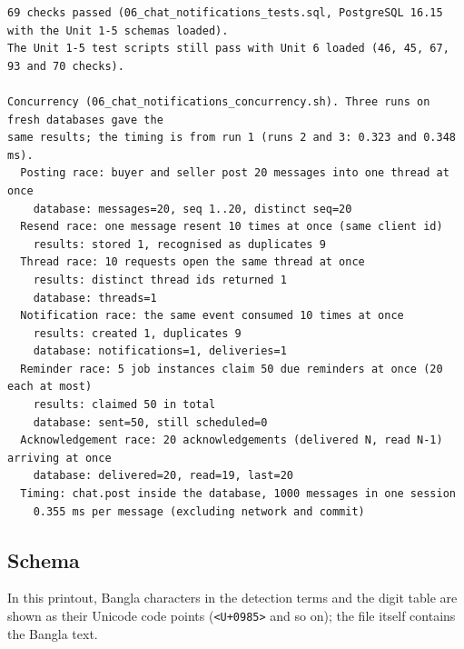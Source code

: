 \documentclass[11pt,a4paper]{article}
\begin{document}
{\begin{verbatim}
69 checks passed (06_chat_notifications_tests.sql, PostgreSQL 16.15 with the Unit 1-5 schemas loaded).
The Unit 1-5 test scripts still pass with Unit 6 loaded (46, 45, 67, 93 and 70 checks).

Concurrency (06_chat_notifications_concurrency.sh). Three runs on fresh databases gave the
same results; the timing is from run 1 (runs 2 and 3: 0.323 and 0.348 ms).
  Posting race: buyer and seller post 20 messages into one thread at once
    database: messages=20, seq 1..20, distinct seq=20
  Resend race: one message resent 10 times at once (same client id)
    results: stored 1, recognised as duplicates 9
  Thread race: 10 requests open the same thread at once
    results: distinct thread ids returned 1
    database: threads=1
  Notification race: the same event consumed 10 times at once
    results: created 1, duplicates 9
    database: notifications=1, deliveries=1
  Reminder race: 5 job instances claim 50 due reminders at once (20 each at most)
    results: claimed 50 in total
    database: sent=50, still scheduled=0
  Acknowledgement race: 20 acknowledgements (delivered N, read N-1) arriving at once
    database: delivered=20, read=19, last=20
  Timing: chat.post inside the database, 1000 messages in one session
    0.355 ms per message (excluding network and commit)
\end{verbatim}
}
\subsection{Schema}
In this printout, Bangla characters in the detection terms and the digit table are shown as their Unicode code points (\texttt{<U+0985>} and so on); the file itself contains the Bangla text.

\end{document}
